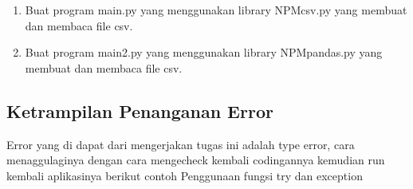 \begin{enumerate}
	
	
	\item Buat program main.py yang menggunakan library NPMcsv.py yang membuat dan membaca file csv.
	
	
	
	\item Buat program main2.py yang menggunakan library NPMpandas.py yang membuat dan membaca file csv.
	
	
	
\end{enumerate}

\subsection{Ketrampilan Penanganan Error}
Error yang di dapat dari mengerjakan tugas ini adalah type error, cara menaggulaginya dengan cara mengecheck kembali codingannya
kemudian run kembali aplikasinya
berikut contoh Penggunaan fungsi try dan exception

